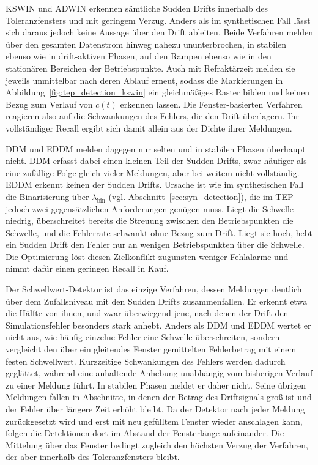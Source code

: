 %
\ac{KSWIN} und \ac{ADWIN} erkennen sämtliche Sudden Drifts innerhalb des Toleranzfensters und mit geringem Verzug. Anders als im synthetischen Fall lässt sich daraus jedoch keine Aussage über den Drift ableiten. Beide Verfahren melden über den gesamten Datenstrom hinweg nahezu ununterbrochen, in stabilen ebenso wie in drift-aktiven Phasen, auf den Rampen ebenso wie in den stationären Bereichen der Betriebspunkte. Auch mit Refraktärzeit melden sie jeweils unmittelbar nach deren Ablauf erneut, sodass die Markierungen in Abbildung~\ref{fig:tep_detection_kswin} ein gleichmäßiges Raster bilden und keinen Bezug zum Verlauf von $c(t)$ erkennen lassen. Die Fenster-basierten Verfahren reagieren also auf die Schwankungen des Fehlers, die den Drift überlagern. Ihr vollständiger Recall ergibt sich damit allein aus der Dichte ihrer Meldungen. \par
%
\ac{DDM} und \ac{EDDM} melden dagegen nur selten und in stabilen Phasen überhaupt nicht. \ac{DDM} erfasst dabei einen kleinen Teil der Sudden Drifts, zwar häufiger als eine zufällige Folge gleich vieler Meldungen, aber bei weitem nicht vollständig. \ac{EDDM} erkennt keinen der Sudden Drifts. Ursache ist wie im synthetischen Fall die Binarisierung über $\lambda_{\mathrm{bin}}$ (vgl. Abschnitt~\ref{sec:syn_detection}), die im \ac{TEP} jedoch zwei gegensätzlichen Anforderungen genügen muss. Liegt die Schwelle niedrig, überschreitet bereits die Streuung zwischen den Betriebspunkten die Schwelle, und die Fehlerrate schwankt ohne Bezug zum Drift. Liegt sie hoch, hebt ein Sudden Drift den Fehler nur an wenigen Betriebspunkten über die Schwelle. Die Optimierung löst diesen Zielkonflikt zugunsten weniger Fehlalarme und nimmt dafür einen geringen Recall in Kauf. \par
%
Der Schwellwert-Detektor ist das einzige Verfahren, dessen Meldungen deutlich über dem Zufallsniveau mit den Sudden Drifts zusammenfallen. Er erkennt etwa die Hälfte von ihnen, und zwar überwiegend jene, nach denen der Drift den Simulationsfehler besonders stark anhebt. Anders als \ac{DDM} und \ac{EDDM} wertet er nicht aus, wie häufig einzelne Fehler eine Schwelle überschreiten, sondern vergleicht den über ein gleitendes Fenster gemittelten Fehlerbetrag mit einem festen Schwellwert. Kurzzeitige Schwankungen des Fehlers werden dadurch geglättet, während eine anhaltende Anhebung unabhängig vom bisherigen Verlauf zu einer Meldung führt. In stabilen Phasen meldet er daher nicht. Seine übrigen Meldungen fallen in Abschnitte, in denen der Betrag des Driftsignals groß ist und der Fehler über längere Zeit erhöht bleibt. Da der Detektor nach jeder Meldung zurückgesetzt wird und erst mit neu gefülltem Fenster wieder anschlagen kann, folgen die Detektionen dort im Abstand der Fensterlänge aufeinander. Die Mittelung über das Fenster bedingt zugleich den höchsten Verzug der Verfahren, der aber innerhalb des Toleranzfensters bleibt. \par
